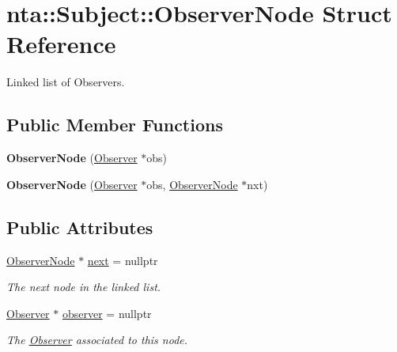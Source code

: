 \hypertarget{structnta_1_1Subject_1_1ObserverNode}{}\section{nta\+:\+:Subject\+:\+:Observer\+Node Struct Reference}
\label{structnta_1_1Subject_1_1ObserverNode}


Linked list of Observers.  


\subsection*{Public Member Functions}
\begin{DoxyCompactItemize}
\item 
\mbox{\label{structnta_1_1Subject_1_1ObserverNode_a6b60bb1d8f32fdc998d3a2c3a46af6d0}} 
{\bfseries Observer\+Node} (\hyperlink{classnta_1_1Observer}{Observer} $\ast$obs)
\item 
\mbox{\label{structnta_1_1Subject_1_1ObserverNode_a6aea9a3891f5f5d3623fe19767769acb}} 
{\bfseries Observer\+Node} (\hyperlink{classnta_1_1Observer}{Observer} $\ast$obs, \hyperlink{structnta_1_1Subject_1_1ObserverNode}{Observer\+Node} $\ast$nxt)
\end{DoxyCompactItemize}
\subsection*{Public Attributes}
\begin{DoxyCompactItemize}
\item 
\mbox{\label{structnta_1_1Subject_1_1ObserverNode_a2b9a8b246840410a5087eec5692cba52}} 
\hyperlink{structnta_1_1Subject_1_1ObserverNode}{Observer\+Node} $\ast$ \hyperlink{structnta_1_1Subject_1_1ObserverNode_a2b9a8b246840410a5087eec5692cba52}{next} = nullptr
\begin{DoxyCompactList}\small\item\em The next node in the linked list. \end{DoxyCompactList}\item 
\mbox{\label{structnta_1_1Subject_1_1ObserverNode_a5342cc214683af3c4d1faa60914d9155}} 
\hyperlink{classnta_1_1Observer}{Observer} $\ast$ \hyperlink{structnta_1_1Subject_1_1ObserverNode_a5342cc214683af3c4d1faa60914d9155}{observer} = nullptr
\begin{DoxyCompactList}\small\item\em The \hyperlink{classnta_1_1Observer}{Observer} associated to this node. \end{DoxyCompactList}\end{DoxyCompactItemize}


